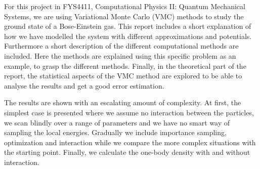 For this project in FYS4411, Computational Physics II: Quantum Mechanical Systems, we are using Variational Monte Carlo (VMC) methods to study the ground state of a Bose-Einstein gas. This report includes a short explanation of how we have modelled the system with different approximations and potentials. Furthermore a short description of the different computational methods are included. Here the methods are explained using this specific problem as an example, to grasp the different methods. Finally, in the theoretical part of the report, the statistical aspects of the VMC method are explored to be able to analyse the results and get a good error estimation.

The results are shown with an escalating amount of complexity. At first, the simplest case is presented where we assume no interaction between the particles, we scan blindly over a range of parameters and we have no smart way of sampling the local energies. Gradually we include importance sampling, optimization and interaction while we compare the more complex situations with the starting point. Finally, we calculate the one-body density with and without interaction.